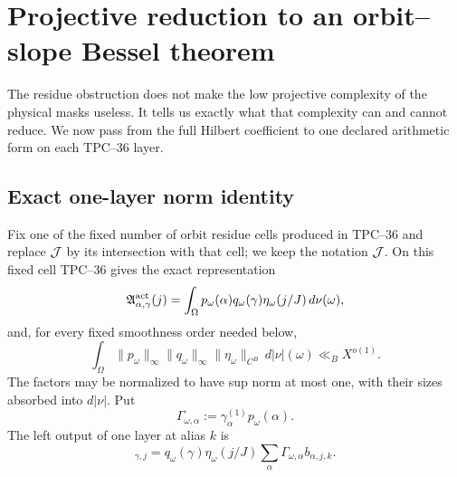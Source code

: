 \section{Projective reduction to an orbit--slope Bessel theorem}
\label{sec:tpc42-projective-orbit}

The residue obstruction does not make the low projective complexity of
the physical masks useless.  It tells us exactly what that complexity can
and cannot reduce.  We now pass from the full Hilbert coefficient to one
declared arithmetic form on each TPC--36 layer.

\subsection{Exact one-layer norm identity}

Fix one of the fixed number of orbit residue cells produced in TPC--36 and
replace \(\mathcal J\) by its intersection with that cell; we keep the notation
\(\mathcal J\).  On this fixed cell TPC--36 gives the exact representation
\begin{equation}
 \mathfrak A_{\alpha,\gamma}^{\rm act}(j)
 =\int_\Omega
 p_\omega(\alpha)q_\omega(\gamma)
 \eta_\omega(j/J)\,d\nu(\omega),
 \label{eq:tpc42-projective-representation}
\end{equation}
and, for every fixed smoothness order needed below,
\begin{equation}
 \int_\Omega
 \|p_\omega\|_\infty
 \|q_\omega\|_\infty
 \|\eta_\omega\|_{C^B}\,d|\nu|(\omega)
 \ll_B X^{o(1)}.
 \label{eq:tpc42-projective-mass}
\end{equation}
The factors may be normalized to have sup norm at most one, with their
sizes absorbed into \(d|\nu|\).  Put
\begin{equation}
 \Gamma_{\omega,\alpha}
 :=\gamma_\alpha^{(1)}p_\omega(\alpha).
 \label{eq:tpc42-layer-source}
\end{equation}
The left output of one layer at alias \(k\) is
\begin{equation}
 [\mathscr T_{\omega,k}^L]_{\gamma,j}
 =q_\omega(\gamma)\eta_\omega(j/J)
  \sum_\alpha\Gamma_{\omega,\alpha}b_{\alpha,j,k}.
 \label{eq:tpc42-one-layer-output}
\end{equation}

